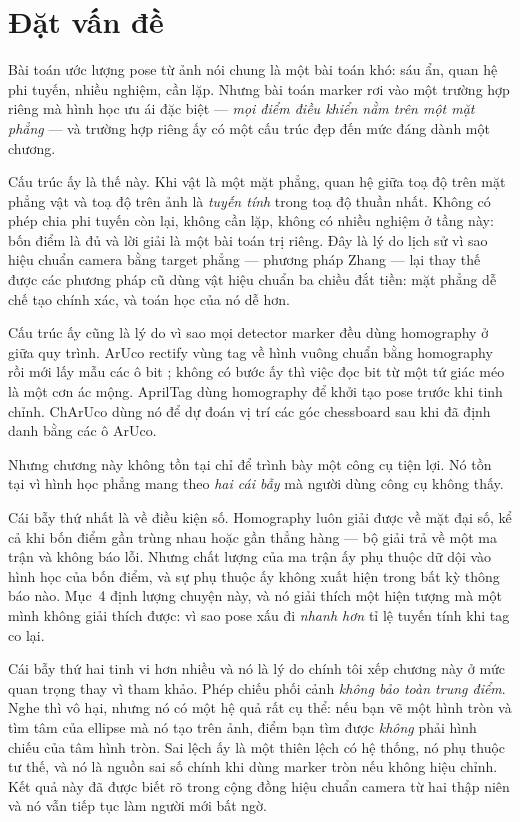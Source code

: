 \documentclass[../../marker.tex]{subfiles}
\begin{document}
\section{Đặt vấn đề}

Bài toán ước lượng pose từ ảnh nói chung là một bài toán khó: sáu ẩn, quan hệ phi tuyến, nhiều nghiệm, cần lặp. Nhưng bài toán marker rơi vào một trường hợp riêng mà hình học ưu ái đặc biệt --- \emph{mọi điểm điều khiển nằm trên một mặt phẳng} --- và trường hợp riêng ấy có một cấu trúc đẹp đến mức đáng dành một chương.

Cấu trúc ấy là thế này. Khi vật là một mặt phẳng, quan hệ giữa toạ độ trên mặt phẳng vật và toạ độ trên ảnh là \emph{tuyến tính} trong toạ độ thuần nhất. Không có phép chia phi tuyến còn lại, không cần lặp, không có nhiều nghiệm ở tầng này: bốn điểm là đủ và lời giải là một bài toán trị riêng. Đây là lý do lịch sử vì sao hiệu chuẩn camera bằng target phẳng --- phương pháp Zhang \cite{zhang2000flexible} --- lại thay thế được các phương pháp cũ dùng vật hiệu chuẩn ba chiều đắt tiền: mặt phẳng dễ chế tạo chính xác, và toán học của nó dễ hơn.

Cấu trúc ấy cũng là lý do vì sao mọi detector marker đều dùng homography ở giữa quy trình. ArUco rectify vùng tag về hình vuông chuẩn bằng homography rồi mới lấy mẫu các ô bit \cite{garrido2014automatic}; không có bước ấy thì việc đọc bit từ một tứ giác méo là một cơn ác mộng. AprilTag dùng homography để khởi tạo pose trước khi tinh chỉnh. ChArUco dùng nó để dự đoán vị trí các góc chessboard sau khi đã định danh bằng các ô ArUco.

Nhưng chương này không tồn tại chỉ để trình bày một công cụ tiện lợi. Nó tồn tại vì hình học phẳng mang theo \emph{hai cái bẫy} mà người dùng công cụ không thấy.

Cái bẫy thứ nhất là về điều kiện số. Homography luôn giải được về mặt đại số, kể cả khi bốn điểm gần trùng nhau hoặc gần thẳng hàng --- bộ giải trả về một ma trận và không báo lỗi. Nhưng chất lượng của ma trận ấy phụ thuộc dữ dội vào hình học của bốn điểm, và sự phụ thuộc ấy không xuất hiện trong bất kỳ thông báo nào. Mục~4 định lượng chuyện này, và nó giải thích một hiện tượng mà  một mình không giải thích được: vì sao pose xấu đi \emph{nhanh hơn} tỉ lệ tuyến tính khi tag co lại.

Cái bẫy thứ hai tinh vi hơn nhiều và nó là lý do chính tôi xếp chương này ở mức quan trọng thay vì tham khảo. Phép chiếu phối cảnh \emph{không bảo toàn trung điểm}. Nghe thì vô hại, nhưng nó có một hệ quả rất cụ thể: nếu bạn vẽ một hình tròn và tìm tâm của ellipse mà nó tạo trên ảnh, điểm bạn tìm được \emph{không} phải hình chiếu của tâm hình tròn. Sai lệch ấy là một thiên lệch có hệ thống, nó phụ thuộc tư thế, và nó là nguồn sai số chính khi dùng marker tròn nếu không hiệu chỉnh. Kết quả này đã được biết rõ trong cộng đồng hiệu chuẩn camera từ hai thập niên \cite{heikkila2000geometric,mallon2007bias} và nó vẫn tiếp tục làm người mới bất ngờ.
\end{document}

